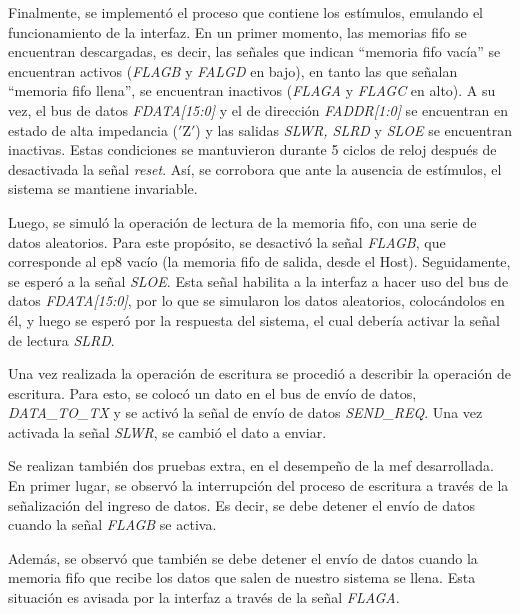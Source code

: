 Finalmente, se implementó el proceso que contiene los estímulos, emulando el funcionamiento de la interfaz. En un primer momento, las memorias \acrshort{fifo} se encuentran descargadas, es decir, las señales que indican ``memoria \acrshort{fifo} vacía'' se encuentran activos ({\it FLAGB} y {\it FALGD} en bajo), en tanto las que señalan ``memoria \acrshort{fifo} llena'', se encuentran inactivos ({\it FLAGA} y {\it FLAGC} en alto).
A su vez, el bus de datos {\it FDATA[15:0]} y el de dirección {\it FADDR[1:0]} se encuentran en estado de alta impedancia ($'$Z$'$) y las salidas {\it SLWR, SLRD} y {\it SLOE} se encuentran inactivas. Estas condiciones se mantuvieron durante 5 ciclos de reloj después de desactivada la señal \textit{reset}. Así, se corrobora que ante la ausencia de estímulos, el sistema se mantiene invariable.

Luego, se simuló la operación de lectura de la memoria \acrshort{fifo}, con una serie de datos aleatorios. Para este propósito, se desactivó la señal {\it FLAGB}, que corresponde al \acrshort{ep}8 vacío (la memoria \acrshort{fifo} de salida, desde el Host). Seguidamente, se esperó a la señal {\it SLOE}. Esta señal habilita a la interfaz a hacer uso del bus de datos {\it FDATA[15:0]}, por lo que se simularon los datos aleatorios, colocándolos en él, y luego se esperó por la respuesta del sistema, el cual debería activar la señal de lectura {\it SLRD}.

Una vez realizada la operación de escritura se procedió a describir la operación de escritura. Para esto, se colocó un dato en el bus de envío de datos, {\it DATA\_TO\_TX} y se activó la señal de envío de datos {\it SEND\_REQ}. Una vez activada la señal {\it SLWR}, se cambió el dato a enviar.

Se realizan también dos pruebas extra, en el desempeño de la \acrshort{mef} desarrollada. En primer lugar, se observó la interrupción del proceso de escritura a través de la señalización del ingreso de datos. Es decir, se debe detener el envío de datos cuando la señal {\it FLAGB} se activa.

Además, se observó que también se debe detener el envío de datos cuando la memoria \acrshort{fifo} que recibe los datos que salen de nuestro sistema se llena. Esta situación es avisada por la interfaz a través de la señal {\it FLAGA}.

